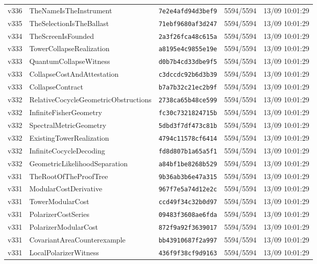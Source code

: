 \documentclass[11pt]{article}
\theoremstyle{definition}\newtheorem{deriv}{Derivation}
\begin{document}
{\begin{longtable}{@{}lllll@{}}
v336 & TheNameIsTheInstrument & \texttt{7e2e4afd94d3bef9} & 5594/5594 & 13/09 10:01:29 \\
v335 & TheSelectionIsTheBallast & \texttt{71ebf9680af3d247} & 5594/5594 & 13/09 10:01:29 \\
v334 & TheScreenIsFounded & \texttt{2a3f26fca48c615a} & 5594/5594 & 13/09 10:01:29 \\
v333 & TowerCollapseRealization & \texttt{a8195e4c9855e19e} & 5594/5594 & 13/09 10:01:29 \\
v333 & QuantumCollapseWitness & \texttt{d0b7b4cd33dbe9f5} & 5594/5594 & 13/09 10:01:29 \\
v333 & CollapseCostAndAttestation & \texttt{c3dccdc92b6d3b39} & 5594/5594 & 13/09 10:01:29 \\
v333 & CollapseContract & \texttt{b7a7b32c21ec2b9f} & 5594/5594 & 13/09 10:01:29 \\
v332 & RelativeCocycleGeometricObstructions & \texttt{2738ca65b48ce599} & 5594/5594 & 13/09 10:01:29 \\
v332 & InfiniteFisherGeometry & \texttt{fc30c7321824715b} & 5594/5594 & 13/09 10:01:29 \\
v332 & SpectralMetricGeometry & \texttt{5dbd3f7df473c81b} & 5594/5594 & 13/09 10:01:29 \\
v332 & ExistingTowerRealization & \texttt{4794c11578cf6414} & 5594/5594 & 13/09 10:01:29 \\
v332 & InfiniteCocycleDecoding & \texttt{fd8d807b1a65a5f1} & 5594/5594 & 13/09 10:01:29 \\
v332 & GeometricLikelihoodSeparation & \texttt{a84bf1be8268b529} & 5594/5594 & 13/09 10:01:29 \\
v331 & TheRootOfTheProofTree & \texttt{9b36ab3b6e47a315} & 5594/5594 & 13/09 10:01:29 \\
v331 & ModularCostDerivative & \texttt{967f7e5a74d12e2c} & 5594/5594 & 13/09 10:01:29 \\
v331 & TowerModularCost & \texttt{ccd49f34c32b0d97} & 5594/5594 & 13/09 10:01:29 \\
v331 & PolarizerCostSeries & \texttt{09483f3608ae6fda} & 5594/5594 & 13/09 10:01:29 \\
v331 & PolarizerModularCost & \texttt{872f9a92f3639017} & 5594/5594 & 13/09 10:01:29 \\
v331 & CovariantAreaCounterexample & \texttt{bb43910687f2a997} & 5594/5594 & 13/09 10:01:29 \\
v331 & LocalPolarizerWitness & \texttt{436f9f38cf9d9163} & 5594/5594 & 13/09 10:01:29 \\

\end{longtable}}
\end{document}
